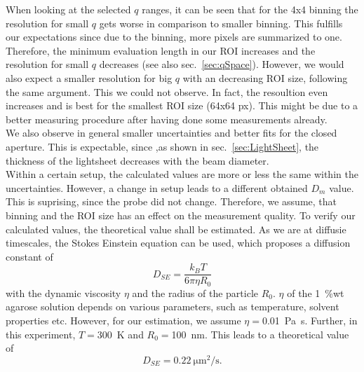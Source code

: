 When looking at the selected $q$ ranges, it can be seen that for the 4x4 binning the resolution for small $q$ gets worse in comparison to smaller binning. This fulfills our expectations since due to the binning, more pixels are summarized to one. Therefore, the minimum evaluation length in our ROI increases and the resolution for small $q$ decreases (see also sec.~\ref{sec:qSpace}). However, we would also expect a smaller resolution for big $q$ with an decreasing ROI size, following the same argument. This we could not observe. In fact, the resoultion even increases and is best for the smallest ROI size (64x64 px). This might be due to a better measuring procedure after having done some measurements already. \\
We also observe in general smaller uncertainties and better fits for the closed aperture. This is expectable, since ,as shown in sec.~\ref{sec:LightSheet}, the thickness of the lightsheet decreases with the beam diameter. \\
Within a certain setup, the calculated values are more or less the same within the uncertainties. However, a change in setup leads to a different obtained $D_m$ value. This is suprising, since the probe did not change. Therefore, we assume, that binning and the ROI size has an effect on the measurement quality. To verify our calculated values, the theoretical value shall be estimated. As we are at diffusie timescales, the Stokes Einstein equation can be used, which proposes a diffusion constant of 
\begin{equation}
    D_{SE} = \frac{k_BT}{6 \pi \eta R_0}
\end{equation}
with the dynamic viscosity $\eta$ and the radius of the particle $R_0$. $\eta$ of the \SI{1}{\percent}wt agarose solution depends on various parameters, such as temperature, solvent properties etc. However, for our estimation, we assume $\eta = $\SI{0.01}{\pascal\second}. Further, in this experiment, $T=$\SI{300}{\kelvin} and $R_0=$\SI{100}{\nano\meter}. This leads to a theoretical value of 
\begin{equation}
    D_{SE} = \SI{0.22}{\micro\meter^2 \per\second}.
\end{equation}

